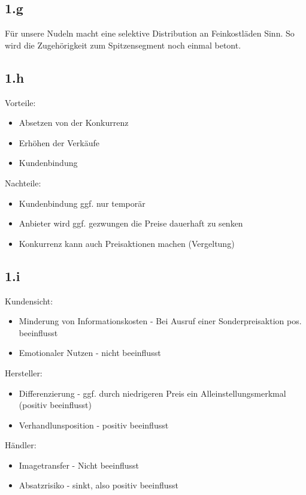 \subsection{1.g}
    Für unsere Nudeln macht eine selektive Distribution an Feinkostläden Sinn. So wird die Zugehörigkeit zum Spitzensegment noch einmal betont.

\subsection{1.h}
    Vorteile:
    \begin{itemize}
        \item Absetzen von der Konkurrenz
        \item Erhöhen der Verkäufe
        \item Kundenbindung
    \end{itemize}

    Nachteile:
    \begin{itemize}
        \item Kundenbindung ggf. nur temporär
        \item Anbieter wird ggf. gezwungen die Preise dauerhaft zu senken
        \item Konkurrenz kann auch Preisaktionen machen (Vergeltung)
    \end{itemize}

\subsection{1.i}
    Kundensicht:
    \begin{itemize}
        \item Minderung von Informationskosten - Bei Ausruf einer Sonderpreisaktion pos. beeinflusst
        \item Emotionaler Nutzen - nicht beeinflusst
    \end{itemize}

    Hersteller:
    \begin{itemize}
        \item Differenzierung - ggf. durch niedrigeren Preis ein Alleinstellungsmerkmal (positiv beeinflusst)
        \item Verhandlunsposition - positiv beeinflusst
    \end{itemize}

    Händler:
    \begin{itemize}
        \item Imagetransfer - Nicht beeinflusst
        \item Absatzrisiko - sinkt, also positiv beeinflusst
    \end{itemize}

